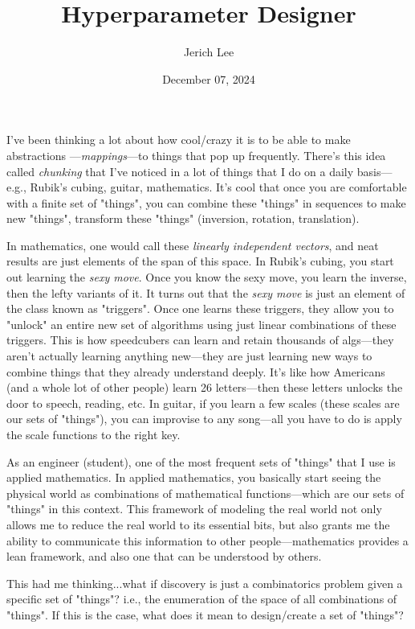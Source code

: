 \documentclass[12pt]{article}
\title{Hyperparameter Designer}
\author{Jerich Lee}
\date{December 07, 2024}
\theoremstyle{definition} %
\theoremstyle{plain} %
\begin{document}
\maketitle

I've been thinking a lot about how cool/crazy it is to be able to make abstractions
—\emph{mappings}—to things that pop up frequently. There's this idea
called \emph{chunking} that I've noticed in a lot of things that I do on a daily basis—e.g., Rubik's cubing, guitar, mathematics. It's cool that once you 
are comfortable with a finite set of "things", you can combine these "things" in sequences to make new "things", transform these "things" (inversion, rotation, translation). 

In mathematics, one would call these \emph{linearly independent vectors}, and neat results are just elements of the span of this space.
In Rubik's cubing, you start out learning the \emph{sexy move}. Once you know the sexy move, you learn the inverse, then the lefty variants of it. It turns out that the \emph{sexy move} is just an element of the class known as "triggers". Once one learns these triggers, they 
allow you to "unlock" an entire new set of algorithms using just linear combinations of these triggers. This is how speedcubers can learn and retain thousands of algs—they aren't actually learning anything new—they are just learning new ways to combine things that they already understand deeply. It's like how Americans (and a whole lot of other people) learn 26 letters—then these letters unlocks the 
door to speech, reading, etc. In guitar, if you learn a few scales (these scales are our sets of "things"), you can improvise to any song—all you have to do is apply the scale functions to the right key.
    

As an engineer (student), one of the most frequent sets of "things" that I use is applied mathematics. In applied mathematics, you basically start seeing the physical world as combinations of mathematical functions—which are our sets of "things" in this context. This framework of modeling the real world not only allows me to reduce the real world to its essential bits, but also grants me the ability to communicate this information to other people—mathematics provides a lean framework, and also one that can be understood by others.

This had me thinking...what if discovery is just a combinatorics problem given a specific set of "things"? i.e., the enumeration of the space of all combinations of "things". If this is the case, what does it mean to design/create a set of "things"? 
\end{document}
